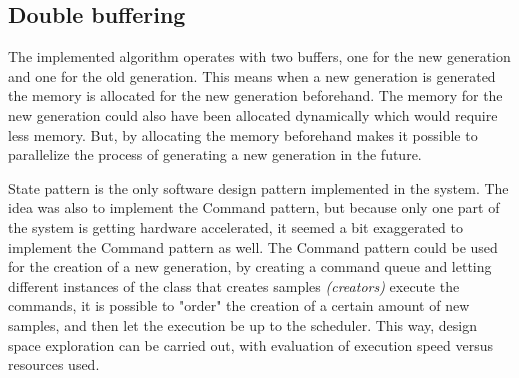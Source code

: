 \subsection{Double buffering}
The implemented algorithm operates with two buffers, one for the new generation and one for the old generation. This means when a new generation is generated the memory is allocated for the new generation beforehand. The memory for the new generation could also have been allocated dynamically which would require less memory. But, by allocating the memory beforehand makes it possible to parallelize the process of generating a new generation in the future.

State pattern is the only software design pattern implemented in the system. The idea was also to implement the Command pattern, but because only one part of the system is getting hardware accelerated, it seemed a bit exaggerated to implement the Command pattern as well. The Command pattern could be used for the creation of a new generation, by creating a command queue and letting different instances of the class that creates samples \textit{(creators)} execute the commands, it is possible to "order" the creation of a certain amount of new samples, and then let the execution be up to the scheduler. This way, design space exploration can be carried out, with evaluation of execution speed versus resources used.

